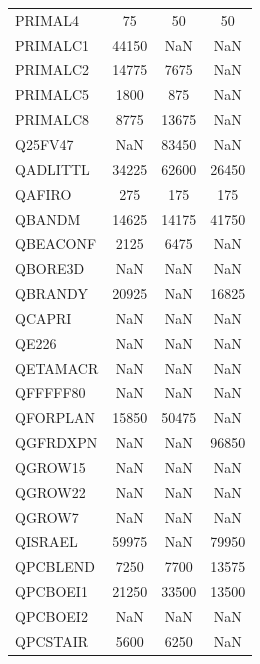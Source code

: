 \begin{longtable}{lccc}
PRIMAL4  &            75 &            50 &            50 \\
PRIMALC1 &         44150 &           NaN &           NaN \\
PRIMALC2 &         14775 &          7675 &           NaN \\
PRIMALC5 &          1800 &           875 &           NaN \\
PRIMALC8 &          8775 &         13675 &           NaN \\
Q25FV47  &           NaN &         83450 &           NaN \\
QADLITTL &         34225 &         62600 &         26450 \\
QAFIRO   &           275 &           175 &           175 \\
QBANDM   &         14625 &         14175 &         41750 \\
QBEACONF &          2125 &          6475 &           NaN \\
QBORE3D  &           NaN &           NaN &           NaN \\
QBRANDY  &         20925 &           NaN &         16825 \\
QCAPRI   &           NaN &           NaN &           NaN \\
QE226    &           NaN &           NaN &           NaN \\
QETAMACR &           NaN &           NaN &           NaN \\
QFFFFF80 &           NaN &           NaN &           NaN \\
QFORPLAN &         15850 &         50475 &           NaN \\
QGFRDXPN &           NaN &           NaN &         96850 \\
QGROW15  &           NaN &           NaN &           NaN \\
QGROW22  &           NaN &           NaN &           NaN \\
QGROW7   &           NaN &           NaN &           NaN \\
QISRAEL  &         59975 &           NaN &         79950 \\
QPCBLEND &          7250 &          7700 &         13575 \\
QPCBOEI1 &         21250 &         33500 &         13500 \\
QPCBOEI2 &           NaN &           NaN &           NaN \\
QPCSTAIR &          5600 &          6250 &           NaN \\

\end{longtable}

